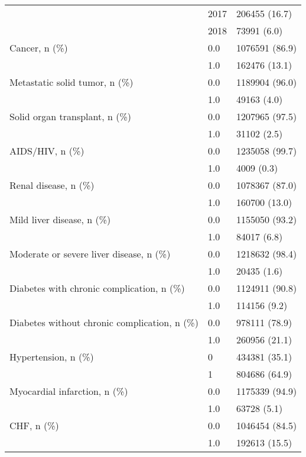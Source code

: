 \begin{tabular}{lll}
                                       & 2017 &      206455 (16.7) \\
                                       & 2018 &        73991 (6.0) \\
Cancer, n (\%) & 0.0 &     1076591 (86.9) \\
                                       & 1.0 &      162476 (13.1) \\
Metastatic solid tumor, n (\%) & 0.0 &     1189904 (96.0) \\
                                       & 1.0 &        49163 (4.0) \\
Solid organ transplant, n (\%) & 0.0 &     1207965 (97.5) \\
                                       & 1.0 &        31102 (2.5) \\
AIDS/HIV, n (\%) & 0.0 &     1235058 (99.7) \\
                                       & 1.0 &         4009 (0.3) \\
Renal disease, n (\%) & 0.0 &     1078367 (87.0) \\
                                       & 1.0 &      160700 (13.0) \\
Mild liver disease, n (\%) & 0.0 &     1155050 (93.2) \\
                                       & 1.0 &        84017 (6.8) \\
Moderate or severe liver disease, n (\%) & 0.0 &     1218632 (98.4) \\
                                       & 1.0 &        20435 (1.6) \\
Diabetes with chronic complication, n (\%) & 0.0 &     1124911 (90.8) \\
                                       & 1.0 &       114156 (9.2) \\
Diabetes without chronic complication, n (\%) & 0.0 &      978111 (78.9) \\
                                       & 1.0 &      260956 (21.1) \\
Hypertension, n (\%) & 0 &      434381 (35.1) \\
                                       & 1 &      804686 (64.9) \\
Myocardial infarction, n (\%) & 0.0 &     1175339 (94.9) \\
                                       & 1.0 &        63728 (5.1) \\
CHF, n (\%) & 0.0 &     1046454 (84.5) \\
                                       & 1.0 &      192613 (15.5) \\

\end{tabular}
